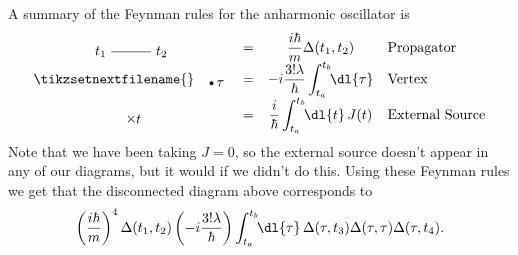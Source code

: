 \documentclass[fleqn]{NotesClass}
\begin{document}
    A summary of the Feynman rules for the anharmonic oscillator is
    \begingroup %
    \tikzexternaldisable
    \def\arraystretch{2}
    \begin{equation}
        \begin{array}{cccl}
            \begin{tikzpicture}[baseline = (current bounding box)]
                \draw node[left] {\(t_1\)} (0, 0) -- ++ (1, 0) node[right] {\(t_2\)};
            \end{tikzpicture}
            &=&
            \displaystyle \frac{i\hbar}{m}\Delta(t_1, t_2) & \text{Propagator}\\
            \tikzsetnextfilename{}
            \begin{tikzpicture}[baseline = (current bounding box)]
                \fill circle [radius = 0.05] node[right] {\(\tau\)} node[left, white] {\(\tau\)};
            \end{tikzpicture}
            &=&
            \displaystyle -i\frac{3!\lambda}{\hbar} \int_{t_a}^{t_b} \!\! \dl{\tau} & \text{Vertex}\\
            \begin{tikzpicture}[baseline = (current bounding box)]
                \node (x) {\(\times\)};
                \node[right] at (x) {\(t\)};
                \node[left, white] at (x) {\(t\)};
            \end{tikzpicture}
            &=&
            \displaystyle \frac{i}{\hbar} \int_{t_a}^{t_b} \!\! \dl{t} \, J(t) & \text{External Source}
        \end{array}
    \end{equation}
    \tikzexternalenable
    \endgroup %
    Note that we have been taking \(J = 0\), so the external source doesn't appear in any of our diagrams, but it would if we didn't do this.
    Using these Feynman rules we get that the disconnected diagram above corresponds to
    \begin{equation}
        \left( \frac{i\hbar}{m} \right)^{4}\Delta(t_1, t_2) \left( -i\frac{3!\lambda}{\hbar} \right) \int_{t_a}^{t_b}\!\!\dl{\tau} \, \Delta(\tau, t_3)\Delta(\tau, \tau)\Delta(\tau, t_4).
    \end{equation}
    
\end{document}
